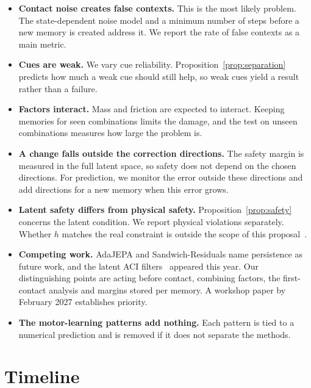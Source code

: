 \documentclass[10pt]{article}
\begin{document}
\begin{itemize}
  \item \textbf{Contact noise creates false contexts.} This is the most likely problem. The
  state-dependent noise model and a minimum number of steps before a new memory is created address it.
  We report the rate of false contexts as a main metric.
  \item \textbf{Cues are weak.} We vary cue reliability. Proposition~\ref{prop:separation} predicts how
  much a weak cue should still help, so weak cues yield a result rather than a failure.
  \item \textbf{Factors interact.} Mass and friction are expected to interact. Keeping memories for
  seen combinations limits the damage, and the test on unseen combinations measures how large the
  problem is.
  \item \textbf{A change falls outside the correction directions.} The safety margin is measured in the
  full latent space, so safety does not depend on the chosen directions. For prediction, we monitor the
  error outside these directions and add directions for a new memory when this error grows.
  \item \textbf{Latent safety differs from physical safety.} Proposition~\ref{prop:safety} concerns the
  latent condition. We report physical violations separately. Whether $h$ matches the real constraint
  is outside the scope of this proposal~\cite{lutkus2025latent}.
  \item \textbf{Competing work.} AdaJEPA and Sandwich-Residuals name persistence as future work, and
  the latent ACI filters~\cite{huriot2026safe,nath2026pixels} appeared this year. Our distinguishing
  points are acting before contact, combining factors, the first-contact analysis and margins stored
  per memory. A workshop paper by February 2027 establishes priority.
  \item \textbf{The motor-learning patterns add nothing.} Each pattern is tied to a numerical
  prediction and is removed if it does not separate the methods.
\end{itemize}

\section{Timeline}
\end{document}
